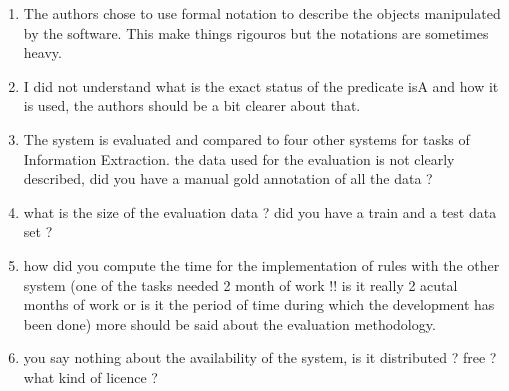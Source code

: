 \begin{enumerate}[leftmargin=0mm,label=\bfseries CommentR1.\arabic*]

  \item \label{Review1.1} 
The authors chose to use formal notation to describe the 
objects manipulated by the software. 
This make things rigouros but the notations are sometimes heavy.



\item \label{Review1.2} 
I did not understand what is the exact status of the predicate 
isA and how it is used, the authors should be a bit 
 clearer about that.



\item \label{Review1.3} 
The system is evaluated and compared to four other systems for 
tasks of Information Extraction.
the data used for the evaluation is not clearly described, 
did you have a manual gold annotation of all the data ?



\item \label{Review1.4} 
what is the size of the evaluation data ? 
did you have a train and a test data set ?



\item \label{Review1.5} 
how did you compute the time for the implementation of rules 
with the other system (one of the tasks needed 2 month of work 
!! is it really 2 acutal months of work or is it the period of 
time during which the development has been done)
more should be said about the evaluation methodology.



\item \label{Review1.5}
you say nothing about the availability of the system, 
is it distributed ? free ? what kind of licence ?



\end{enumerate}

